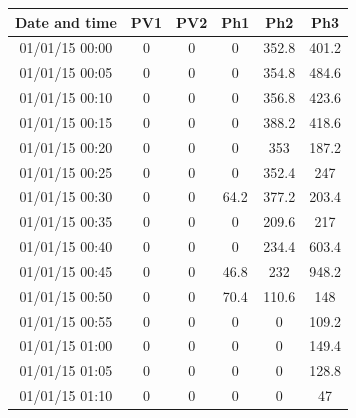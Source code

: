 \documentclass[12pt,a4paper,titlepage]{report}
\begin{document}
\begin{table}[h]
    \begin{tabular}{|c|c|c|c|c|c|}
        \hline
        \textbf{Date and time}      & \textbf{PV1} & \textbf{PV2} & \textbf{Ph1}  & \textbf{Ph2} & \textbf{Ph3}   \\ \hline
        01/01/15 00:00 & 0   & 0   & 0    & 352.8                                              & 401.2 \\ \hline
        01/01/15 00:05 & 0   & 0   & 0    & 354.8                                              & 484.6 \\ \hline
        01/01/15 00:10 & 0   & 0   & 0    & 356.8                                              & 423.6 \\ \hline
        01/01/15 00:15 & 0   & 0   & 0    & 388.2                                              & 418.6 \\ \hline
        01/01/15 00:20 & 0   & 0   & 0    & 353                                                & 187.2 \\ \hline
        01/01/15 00:25 & 0   & 0   & 0    & 352.4                                              & 247   \\ \hline
        01/01/15 00:30 & 0   & 0   & 64.2 & 377.2                                              & 203.4 \\ \hline
        01/01/15 00:35 & 0   & 0   & 0    & 209.6                                              & 217   \\ \hline
        01/01/15 00:40 & 0   & 0   & 0    & 234.4                                              & 603.4 \\ \hline
        01/01/15 00:45 & 0   & 0   & 46.8 & 232                                                & 948.2 \\ \hline
        01/01/15 00:50 & 0   & 0   & 70.4 & 110.6                                              & 148   \\ \hline
        01/01/15 00:55 & 0   & 0   & 0    & 0                                                  & 109.2 \\ \hline
        01/01/15 01:00 & 0   & 0   & 0    & 0                                                  & 149.4 \\ \hline
        01/01/15 01:05 & 0   & 0   & 0    & 0                                                  & 128.8 \\ \hline
        01/01/15 01:10 & 0   & 0   & 0    & 0                                                  & 47    \\ \hline

\end{tabular}
\end{table}
\end{document}
